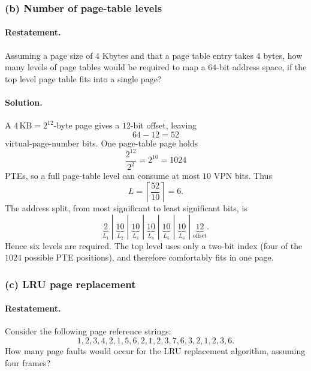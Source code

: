 \subsubsection*{(b) Number of page-table levels}

\paragraph{Restatement.}
Assuming a page size of \(4\) Kbytes and that a page table entry takes
\(4\) bytes, how many levels of page tables would be required to map a
\(64\)-bit address space, if the top level page table fits into a single
page?

\paragraph{Solution.}
A \(4\,\mathrm{KB}=2^{12}\)-byte page gives a \(12\)-bit offset, leaving
\[
 64-12=52
\]
virtual-page-number bits.  One page-table page holds
\[
 \frac{2^{12}}{2^2}=2^{10}=1024
\]
PTEs, so a full page-table level can consume at most \(10\) VPN bits.
Thus
\[
 L=\left\lceil\frac{52}{10}\right\rceil=6.
\]
The address split, from most significant to least significant bits, is
\[
 \underbrace{2}_{L_1}\;|\;
 \underbrace{10}_{L_2}\;|\;
 \underbrace{10}_{L_3}\;|\;
 \underbrace{10}_{L_4}\;|\;
 \underbrace{10}_{L_5}\;|\;
 \underbrace{10}_{L_6}\;|\;
 \underbrace{12}_{\mathrm{offset}}.
\]
Hence six levels are required.  The top level uses only a two-bit
index (four of the \(1024\) possible PTE positions), and therefore
comfortably fits in one page.

\subsubsection*{(c) LRU page replacement}

\paragraph{Restatement.}
Consider the following page reference strings:
\[
1,2,3,4,2,1,5,6,2,1,2,3,7,6,3,2,1,2,3,6.
\]
How many page faults would occur for the LRU replacement algorithm,
assuming four frames?

